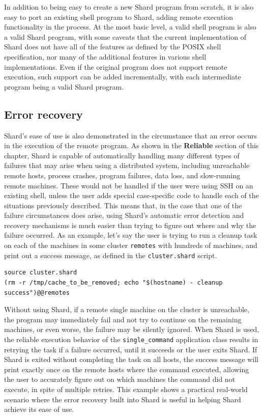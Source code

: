\documentclass[twoside]{report}
\newcommand{\todoi}[1]{\todo[inline, color=blue!20]{TODO: {#1}}}
\begin{document}
In addition to being easy to create a new Shard program from scratch, it is also easy to port an existing shell program to Shard, adding remote execution functionality in the process.
At the most basic level, a valid shell program is also a valid Shard program, with some caveats that the current implementation of Shard does not have all of the features as defined by the POSIX shell specification, nor many of the additional features in various shell implementations.
Even if the original program does not support remote execution, such support can be added incrementally, with each intermediate program being a valid Shard program.

\subsection{Error recovery}

Shard's ease of use is also demonstrated in the circumstance that an error occurs in the execution of the remote program.
As shown in the \textbf{Reliable} section of this chapter, Shard is capable of automatically handling many different types of failures that may arise when using a distributed system, including unreachable remote hosts, process crashes, program failures, data loss, and slow-running remote machines.
These would not be handled if the user were using SSH on an existing shell, unless the user adds special case-specific code to handle each of the situations previously described.
This means that, in the case that one of the failure circumstances does arise, using Shard's automatic error detection and recovery mechanisms is much easier than trying to figure out where and why the failure occurred.
As an example, let's say the user is trying to run a cleanup task on each of the machines in some cluster \texttt{remotes} with hundreds of machines, and print out a success message, as defined in the \texttt{cluster.shard} script.

\begin{minipage}[c]{\textwidth-15pt}
  \begin{lstlisting}[language=Shard]
source cluster.shard
(rm -r /tmp/cache_to_be_removed; echo "$(hostname) - cleanup success")@@remotes
\end{lstlisting}
  \smallskip
\end{minipage}

Without using Shard, if a remote single machine on the cluster is unreachable, the program may immediately fail and not try to continue on the remaining machines, or even worse, the failure may be silently ignored.
When Shard is used, the reliable execution behavior of the \texttt{single\_command} application class results in retrying the task if a failure occurred, until it succeeds or the user exits Shard.
If Shard is exited without completing the task on all hosts, the success message will print exactly once on the remote hosts where the command executed, allowing the user to accurately figure out on which machines the command did not execute, in spite of multiple retries.
This example shows a practical real-world scenario where the error recovery built into Shard is useful in helping Shard achieve its ease of use.
\end{document}

